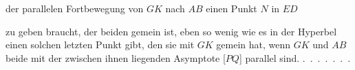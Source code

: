 %
der parallelen Fortbewegung von $GK$ nach $AB$ einen  Punkt $N$ in $ED$
\begin{center}\end{center}
\noindent zu geben braucht, der beiden gemein ist, eben so wenig wie es in der Hyperbel einen solchen letzten Punkt gibt, den sie mit $GK$ gemein hat, wenn $GK$ und $AB$ beide mit der zwischen ihnen liegenden Asymptote [$PQ$] parallel sind. \mbox{.\ .\ .\ .\ .\ .\ .}
